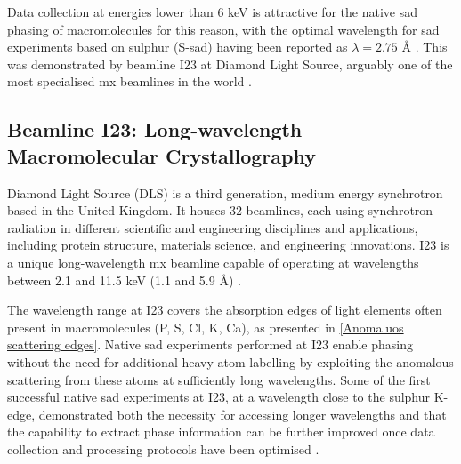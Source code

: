 Data collection at energies lower than 6 \unit{keV} is attractive for the native \ac{sad} phasing of macromolecules for this reason, with the optimal wavelength for \ac{sad} experiments based on sulphur (S-\ac{sad}) having been reported as $\lambda = 2.75$ Å \cite{Omari2023}. This was demonstrated %
by beamline I23 at Diamond Light Source, arguably one of the most specialised \ac{mx} beamlines in the world \cite{Foerster2019}. %

\subsection{Beamline I23: Long-wavelength Macromolecular Crystallography}

Diamond Light Source (DLS) is a third generation, medium energy synchrotron based in the United Kingdom. It houses 32 beamlines, each using synchrotron radiation in different scientific and engineering disciplines and applications, including protein structure, materials science, and engineering innovations.
I23 is a unique long-wavelength \ac{mx} beamline capable of operating at wavelengths between 2.1 and 11.5 \unit{keV} (1.1 and 5.9 Å) \cite{Wagner2016}.

The wavelength range at I23 covers the absorption edges of
light elements often present in macromolecules (P, S, Cl, K, Ca), as presented in \cref{Anomaluos scattering edges}.
Native \ac{sad} experiments performed at I23 enable phasing without the need for additional heavy-atom labelling by exploiting the anomalous scattering from these atoms at sufficiently long wavelengths. Some of the first successful native \ac{sad} experiments at I23, at a wavelength close to the sulphur K-edge, demonstrated both the necessity for accessing longer wavelengths and that the capability to extract phase information can be further improved once data collection and processing protocols have been optimised \cite{Aurelius2017}.

